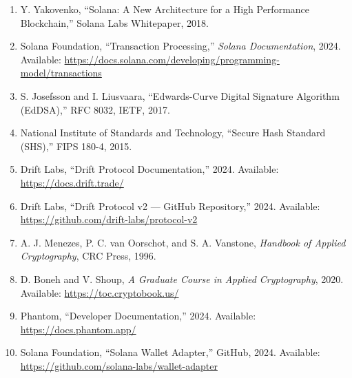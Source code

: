 \documentclass[12pt,a4paper]{article}
\begin{document}
\begin{enumerate}
    \item Y. Yakovenko, ``Solana: A New Architecture for a High Performance Blockchain,'' Solana Labs Whitepaper, 2018.
    \item Solana Foundation, ``Transaction Processing,'' \textit{Solana Documentation}, 2024. Available: \url{https://docs.solana.com/developing/programming-model/transactions}
    \item S. Josefsson and I. Liusvaara, ``Edwards-Curve Digital Signature Algorithm (EdDSA),'' RFC 8032, IETF, 2017.
    \item National Institute of Standards and Technology, ``Secure Hash Standard (SHS),'' FIPS 180-4, 2015.
    \item Drift Labs, ``Drift Protocol Documentation,'' 2024. Available: \url{https://docs.drift.trade/}
    \item Drift Labs, ``Drift Protocol v2 --- GitHub Repository,'' 2024. Available: \url{https://github.com/drift-labs/protocol-v2}
    \item A. J. Menezes, P. C. van Oorschot, and S. A. Vanstone, \textit{Handbook of Applied Cryptography}, CRC Press, 1996.
    \item D. Boneh and V. Shoup, \textit{A Graduate Course in Applied Cryptography}, 2020. Available: \url{https://toc.cryptobook.us/}
    \item Phantom, ``Developer Documentation,'' 2024. Available: \url{https://docs.phantom.app/}
    \item Solana Foundation, ``Solana Wallet Adapter,'' GitHub, 2024. Available: \url{https://github.com/solana-labs/wallet-adapter}
\end{enumerate}
\end{document}
